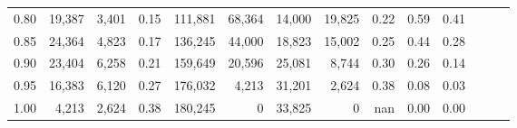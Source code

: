 \begin{tabular}{rrrrrrrrrrrrrr}
0.80 &  19,387 &  3,401 &  0.15 &  111,881 &   68,364 &  14,000 &  19,825 &  0.22 &  0.59 &      0.41 \\
0.85 &  24,364 &  4,823 &  0.17 &  136,245 &   44,000 &  18,823 &  15,002 &  0.25 &  0.44 &      0.28 \\
0.90 &  23,404 &  6,258 &  0.21 &  159,649 &   20,596 &  25,081 &   8,744 &  0.30 &  0.26 &      0.14 \\
0.95 &  16,383 &  6,120 &  0.27 &  176,032 &    4,213 &  31,201 &   2,624 &  0.38 &  0.08 &      0.03 \\
1.00 &   4,213 &  2,624 &  0.38 &  180,245 &        0 &  33,825 &       0 &   nan &  0.00 &      0.00 \\
\bottomrule
\end{tabular}

